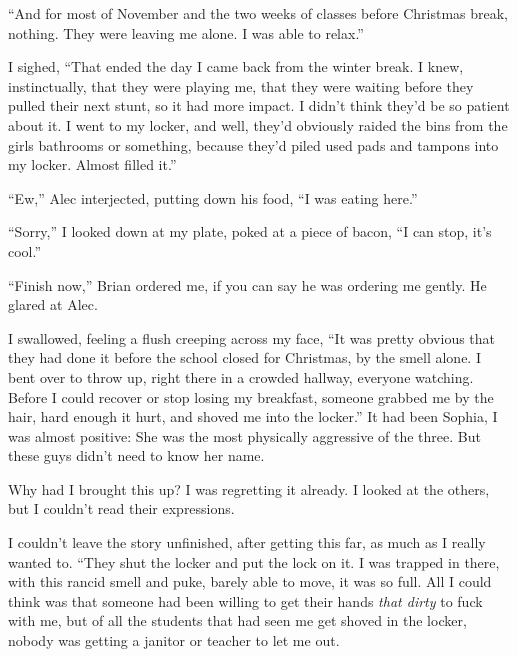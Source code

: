 ``And for most of November and the two weeks of classes before Christmas break, nothing.  They were leaving me alone.  I was able to relax.''



I sighed, ``That ended the day I came back from the winter break.  I knew, instinctually, that they were playing me, that they were waiting before they pulled their next stunt, so it had more impact.  I didn't think they'd be so patient about it.  I went to my locker, and well, they'd obviously raided the bins from the girls bathrooms or something, because they'd piled used pads and tampons into my locker.  Almost filled it.''



``Ew,'' Alec interjected, putting down his food, ``I was eating here.''



``Sorry,'' I looked down at my plate, poked at a piece of bacon, ``I can stop, it's cool.''



``Finish now,'' Brian ordered me, if you can say he was ordering me gently.  He glared at Alec.



I swallowed, feeling a flush creeping across my face, ``It was pretty obvious that they had done it before the school closed for Christmas, by the smell alone.  I bent over to throw up, right there in a crowded hallway, everyone watching.  Before I could recover or stop losing my breakfast, someone grabbed me by the hair, hard enough it hurt, and shoved me into the locker.''  It had been Sophia, I was almost positive: She was the most physically aggressive of the three.  But these guys didn't need to know her name.



Why had I brought this up?  I was regretting it already.  I looked at the others, but I couldn't read their expressions.



I couldn't leave the story unfinished, after getting this far, as much as I really wanted to. ``They shut the locker and put the lock on it.  I was trapped in there, with this rancid smell and puke, barely able to move, it was so full.  All I could think was that someone had been willing to get their hands \emph{that dirty} to fuck with me, but of all the students that had seen me get shoved in the locker, nobody was getting a janitor or teacher to let me out.



